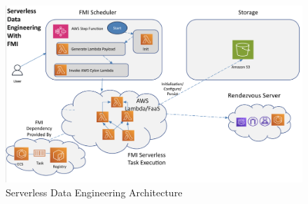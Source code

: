 \begin{figure}[ht]
    \begin{center}
    \includegraphics[width=\linewidth]{source/Figure/serverlessdataengineering.png}
    \end{center}
    \caption{Serverless Data Engineering Architecture}
    \label{fig:serverlessdataengineering}
\end{figure}

